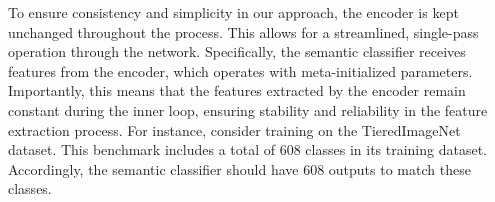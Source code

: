 \documentclass[letterpaper]{article} %
\newcommand{\nj}[1]{\textcolor{black}{#1}}
\newcommand{\jh}[1]{\textcolor{black}{#1}}
\newcommand{\yr}[1]{\textcolor{black}{#1}}
\newcommand{\ie}{\textit{i}.\textit{e}., }
\begin{document}

To ensure consistency and simplicity in our approach, the encoder is kept unchanged throughout the process. This allows for a streamlined, single-pass operation through the network. Specifically, the semantic classifier receives features from the encoder, which operates with meta-initialized parameters. Importantly, this means that the features extracted by the encoder remain constant during the inner loop, ensuring stability and reliability in the feature extraction process. 
For instance, consider training on the TieredImageNet dataset. This benchmark includes a total of 608 classes in its training dataset. 
Accordingly, the semantic classifier should have 608 outputs to match these classes.
\end{document}
